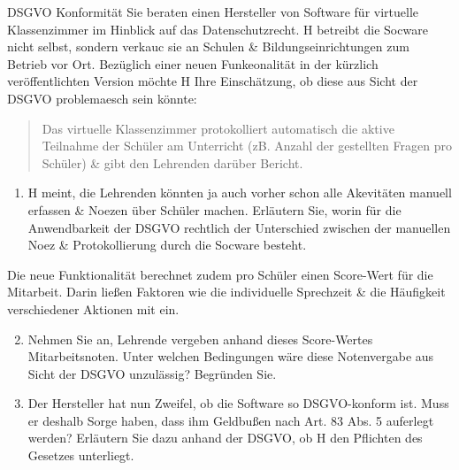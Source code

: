 \documentclass{exercisesheet}
\begin{document}
\begin{exercise*}{DSGVO Konformität}
  Sie beraten einen Hersteller von Software für virtuelle Klassenzimmer im Hinblick auf das Datenschutzrecht. H betreibt die Socware nicht selbst, sondern verkauc sie an Schulen \& Bildungseinrichtungen zum Betrieb vor Ort. Bezüglich einer neuen Funkeonalität in der kürzlich veröffentlichten Version möchte H Ihre Einschätzung, ob diese aus Sicht der DSGVO problemaesch sein könnte:
  \begin{quote}
    Das virtuelle Klassenzimmer protokolliert automatisch die aktive Teilnahme der Schüler am Unterricht (zB. Anzahl der gestellten Fragen pro Schüler) \& gibt den Lehrenden darüber Bericht.
  \end{quote}

  \begin{enumerate}
    \item H meint, die Lehrenden könnten ja auch vorher schon alle Akevitäten manuell erfassen \& Noezen über Schüler machen. Erläutern Sie, worin für die Anwendbarkeit der DSGVO rechtlich der Unterschied zwischen der manuellen Noez \& Protokollierung durch die Socware besteht.
  \end{enumerate}

  Die neue Funktionalität berechnet zudem pro Schüler einen Score-Wert für die Mitarbeit. Darin ließen Faktoren wie die individuelle Sprechzeit \& die Häufigkeit verschiedener Aktionen mit ein.

  \begin{enumerate}
    \setcounter{enumi}{1}
    \item Nehmen Sie an, Lehrende vergeben anhand dieses Score-Wertes Mitarbeitsnoten. Unter welchen Bedingungen wäre diese Notenvergabe aus Sicht der DSGVO unzulässig? Begründen Sie.
    \item Der Hersteller hat nun Zweifel, ob die Software so DSGVO-konform ist. Muss er deshalb Sorge haben, dass ihm Geldbußen nach Art. 83 Abs. 5 auferlegt werden? Erläutern Sie dazu anhand der DSGVO, ob H den Pflichten des Gesetzes unterliegt.
  \end{enumerate}
\end{exercise*}
\end{document}
